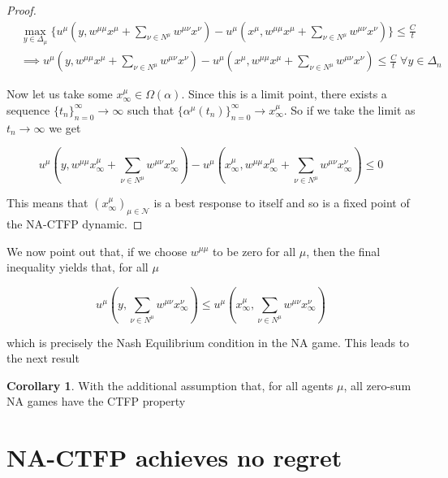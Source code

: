\documentclass{article}
\theoremstyle{definition}
\newtheorem{corollary}{Corollary}
\newcommand{\agentset}{\mathcal{N}}
\newcommand{\wmunu}{w^{\mu \nu}}
\newcommand{\xmu}{x^{\mu}}
\newcommand{\xnu}{x^{\nu}}
\begin{document}
\begin{proof}
    \begin{align}
      & \max_{y \in \Delta_\mu} \{u^\mu(y, w^{\mu \mu} \xmu + \sum_{\nu \in N^\mu} \wmunu \xnu) - u^\mu(\xmu, w^{\mu \mu} \xmu + \sum_{\nu \in N^\mu} \wmunu \xnu) \} \leq \frac{C}{t}\\
      & \implies u^\mu(y, w^{\mu \mu} \xmu + \sum_{\nu \in N^\mu} \wmunu \xnu) - u^\mu(\xmu, w^{\mu \mu} \xmu + \sum_{\nu \in N^\mu} \wmunu \xnu) \leq \frac{C}{t} \; \forall y \in \Delta_n
    \end{align}
    
    Now let us take some $\xmu_\infty \in \Omega(\alpha)$. Since this is a limit point, there exists a sequence $\{t_n\}_{n = 0}^\infty \rightarrow \infty$ such that $\{\alpha^\mu(t_n)\}_{n = 0}^{\infty} \rightarrow \xmu_\infty$. So if we take the limit as $t_n \rightarrow \infty$ we get

    \begin{equation}
      u^\mu(y, w^{\mu \mu} \xmu_\infty + \sum_{\nu \in N^\mu} \wmunu \xnu_\infty) - u^\mu(\xmu_\infty, w^{\mu \mu} \xmu_\infty + \sum_{\nu \in N^\mu} \wmunu \xnu_\infty) \leq 0
    \end{equation}

    This means that $(\xmu_\infty)_{\mu \in \agentset}$ is a best response to itself and so is a fixed point of the NA-CTFP dynamic. 
  \end{proof}

  We now point out that, if we choose $w^{\mu \mu}$ to be zero for all $\mu$, then the final inequality yields that, for all $\mu$

  \begin{equation}
    u^\mu(y, \sum_{\nu \in N^\mu} \wmunu \xnu_\infty) \leq u^\mu(\xmu_\infty, \sum_{\nu \in N^\mu} \wmunu \xnu_\infty)
  \end{equation}

  which is precisely the Nash Equilibrium condition in the NA game. This leads to the next result

  \begin{corollary}
    With the additional assumption that, for all agents $\mu$, all zero-sum NA games have the CTFP property
  \end{corollary}

\section{NA-CTFP achieves no regret}
  \label{sec::CCEConvergence}
\end{document}
